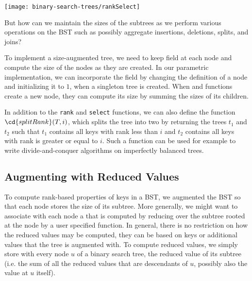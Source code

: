 \begin{chapter}
\begin{example}
\begin{center}
  \texttt{[image: binary-search-trees/rankSelect]}
\end{center}
\end{example}


\begin{question}
  But how can we maintain the sizes of the subtrees as we perform
  various operations on the BST such as possibly aggregate insertions,
  deletions, splits, and joins?
\end{question}
%
To implement a size-augmented tree, we need to keep  field at
each node and compute the size of the nodes as they are created.
%
In our parametric implementation, we can incorporate the 
field by changing the definition of a node and initializing it to $1$,
when a singleton tree is created. 
%
When  and  functions create a new node, they
can compute its size by summing the sizes of its children.
%

In addition to the \texttt{rank} and \texttt{select} functions, we can
also define the function $\cd{splitRank}(T,i)$, which splits the
tree into two by returning the trees $t_1$ and $t_2$ such that $t_1$
contains all keys with rank less than $i$ and $t_2$ contains all keys
with rank is greater or equal to $i$. 
%
Such a function can be used for example to write divide-and-conquer
algorithms on imperfectly balanced trees.





\subsection{Augmenting with Reduced Values}

To compute rank-based properties of keys in a BST, we augmented the
BST so that each node stores the size of its subtree.  More generally,
we might want to associate with each node a  that
is computed by reducing over the subtree rooted at the node by a user
specified function.  In general, there is no restriction on how the
reduced values may be computed, they can be based on keys or
additional values that the tree is augmented with.
%
To compute reduced values, we simply store with every node $u$ of a
binary search tree, the reduced value of its subtree (i.e. the sum of
all the reduced values that are descendants of $u$, possibly also the
value at $u$ itself).


\end{chapter}

